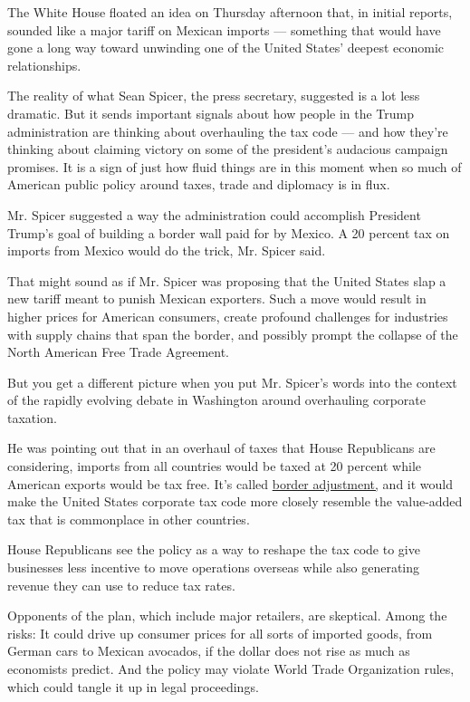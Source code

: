 The White House floated an idea on Thursday afternoon that, in initial
reports, sounded like a major tariff on Mexican imports --- something
that would have gone a long way toward unwinding one of the United
States' deepest economic relationships.

The reality of what Sean Spicer, the press secretary, suggested is a lot
less dramatic. But it sends important signals about how people in the
Trump administration are thinking about overhauling the tax code --- and
how they're thinking about claiming victory on some of the president's
audacious campaign promises. It is a sign of just how fluid things are
in this moment when so much of American public policy around taxes,
trade and diplomacy is in flux.

Mr. Spicer suggested a way the administration could accomplish President
Trump's goal of building a border wall paid for by Mexico. A 20 percent
tax on imports from Mexico would do the trick, Mr. Spicer said.

That might sound as if Mr. Spicer was proposing that the United States
slap a new tariff meant to punish Mexican exporters. Such a move would
result in higher prices for American consumers, create profound
challenges for industries with supply chains that span the border, and
possibly prompt the collapse of the North American Free Trade Agreement.

But you get a different picture when you put Mr. Spicer's words into the
context of the rapidly evolving debate in Washington around overhauling
corporate taxation.

He was pointing out that in an overhaul of taxes that House Republicans
are considering, imports from all countries would be taxed at 20 percent
while American exports would be tax free. It's called
\href{https://www.nytimes.com/2017/01/07/upshot/the-major-potential-impact-of-a-corporate-tax-overhaul.html}{border
adjustment,} and it would make the United States corporate tax code more
closely resemble the value-added tax that is commonplace in other
countries.

House Republicans see the policy as a way to reshape the tax code to
give businesses less incentive to move operations overseas while also
generating revenue they can use to reduce tax rates.

Opponents of the plan, which include major retailers, are skeptical.
Among the risks: It could drive up consumer prices for all sorts of
imported goods, from German cars to Mexican avocados, if the dollar does
not rise as much as economists predict. And the policy may violate World
Trade Organization rules, which could tangle it up in legal proceedings.

